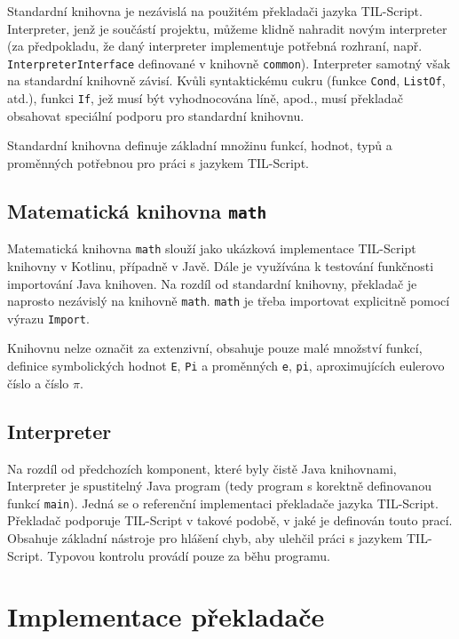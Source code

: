 Standardní knihovna je nezávislá na použitém překladači jazyka TIL-Script. Interpreter, jenž je
součástí projektu, můžeme klidně nahradit novým interpreter (za předpokladu, že daný interpreter
implementuje potřebná rozhraní, např. \lstinline{InterpreterInterface} definované v knihovně
\lstinline{common}). Interpreter samotný však na standardní knihovně závisí. Kvůli syntaktickému
cukru (funkce \lstinline{Cond}, \lstinline{ListOf}, atd.), funkci \lstinline{If}, jež musí být
vyhodnocována líně, apod., musí překladač obsahovat speciální podporu pro standardní knihovnu.

Standardní knihovna definuje základní množinu funkcí, hodnot, typů a proměnných potřebnou pro práci
s jazykem TIL-Script.

\subsection{Matematická knihovna \lstinline{math}}

Matematická knihovna \lstinline{math} slouží jako ukázková implementace TIL-Script knihovny
v Kotlinu, případně v Javě. Dále je využívána k testování funkčnosti importování Java knihoven.
Na rozdíl od standardní knihovny, překladač je naprosto nezávislý na knihovně \lstinline{math}.
\lstinline{math} je třeba importovat explicitně pomocí výrazu \lstinline{Import}.

Knihovnu nelze označit za extenzivní, obsahuje pouze malé množství funkcí, definice symbolických
hodnot \lstinline{E}, \lstinline{Pi} a proměnných \lstinline{e}, \lstinline{pi}, aproximujících
eulerovo číslo a číslo $\pi$.

\subsection{Interpreter}

Na rozdíl od předchozích komponent, které byly čistě Java knihovnami, Interpreter je spustitelný
Java program (tedy program s korektně definovanou funkcí \lstinline{main}). Jedná se o referenční
implementaci překladače jazyka TIL-Script. Překladač podporuje TIL-Script v takové podobě, v jaké je
definován touto prací. Obsahuje základní nástroje pro hlášení chyb, aby ulehčil práci
s jazykem TIL-Script. Typovou kontrolu provádí pouze za běhu programu.

\section{Implementace překladače}

